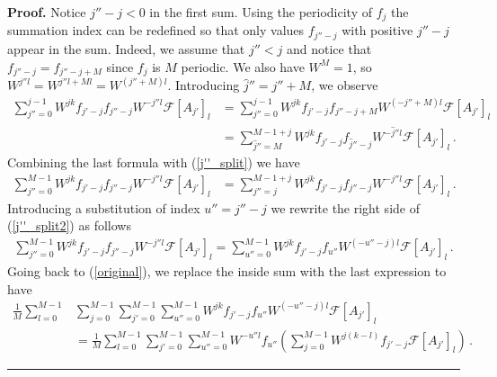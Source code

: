 \documentclass[12pt]{CSUNthesis}
\newenvironment{proof}[1][Proof]{\noindent\textbf{#1.} }{\newline \hspace*{\textwidth}\hspace*{-0,4cm} \rule{0.5em}{0.5em} \vspace{0,2cm}}
\def\calF{\mathcal{F}}
\begin{document}
\begin{proof}
Notice $j''-j < 0$ in the first sum. Using the periodicity of $f_{j}$ the summation index can be redefined so that only values $f_{j''-j}$ with positive $j''-j$ appear in the sum. Indeed, we assume that $j'' < j$ and notice that $f_{j''-j}=f_{j''-j+M}$ since $f_{j}$ is $M$ periodic. We also have $W^{M}=1$, so $W^{j'' l } = W^{j''l+Ml} = W^{(j''+M)l}$. 
Introducing $\hat{j}''=j''+M$, we observe 
\begin{align*}
\sum_{j''=0}^{j-1} W^{jk} f_{j'-j}f_{j''-j} W^{-j'' l } \calF[A_{j'}]_{l} &
=\sum_{j''=0}^{j-1} W^{jk} f_{j'-j}f_{j''-j+M} W^{(-j''+M) l } \calF[A_{j'}]_{l} \\
&=\sum_{\hat{j}''=M}^{M-1+j} W^{jk} f_{j'-j}f_{\hat{j}''-j} W^{-\hat{j}'' l } \calF[A_{j'}]_{l}\, . 
\end{align*}
Combining the last formula with (\ref{j''_split}) we have 
\begin{align}
\label{j''_split2}
\sum_{j''=0}^{M-1} W^{jk} f_{j'-j}f_{j''-j} W^{-j'' l } \calF[A_{j'}]_{l} 
&= \sum_{j''=j}^{M-1+j} W^{jk} f_{j'-j}f_{j''-j} W^{-j'' l } \calF[A_{j'}]_{l} \, .
\end{align}
Introducing a substitution of index $u''=j''-j$ we rewrite the right side of  (\ref{j''_split2}) as follows 
\begin{align*}
\sum_{j''=0}^{M-1} W^{jk} f_{j'-j}f_{j''-j} W^{-j'' l } \calF[A_{j'}]_{l} 
= \sum_{u''=0}^{M-1} W^{jk} f_{j'-j}f_{u''} W^{(-u''-j) l } \calF[A_{j'}]_{l}\, .
\end{align*}
Going back to (\ref{original}), we replace the inside sum with the last expression to have
\begin{align}
\label{original_u''}
\frac{1}{M} \sum_{l=0}^{M-1} &\sum_{j=0}^{M-1} \sum_{j'=0}^{M-1} \sum_{u''=0}^{M-1} W^{jk} f_{j'-j}f_{u''} W^{(-u''-j) l } \calF[A_{j'}]_{l} \nonumber \\
&= \frac{1}{M} \sum_{l=0}^{M-1} \sum_{j'=0}^{M-1} \sum_{u''=0}^{M-1} W^{-u'' l }f_{u''} \left( \sum_{j=0}^{M-1} W^{j(k-l)} f_{j'-j}  \calF[A_{j'}]_{l}  \right)\, .
\end{align}


\end{proof}
\end{document}
